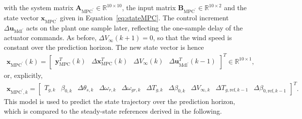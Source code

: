 with the system matrix $\bm{A}_{\text{MPC}^\prime} \in \mathbb{R}^{10 \times 10}$, the input matrix $\bm{B}_{\text{MPC}^\prime} \in \mathbb{R}^{10 \times 2}$ and the state vector $\bm{x}_{\text{MPC}^\prime}$ given in Equation~\eqref{eq:stateMPC}.
The control increment $\Delta\bm{u}_{\text{Mdl}^\prime}$ acts on the plant one sample later, reflecting the one-sample delay of the actuator commands. As before, $\Delta V_{\infty}(k+1) = 0$, so that the wind speed is constant over the prediction horizon. The new state vector is hence
\begin{align} \label{eq:stateMPC}
    \bm{x}_{\text{MPC}^\prime}(k) = \begin{bmatrix} \bm{y}_{\text{MPC}}^T(k) & \Delta\bm{x}_{\text{MPC}}^T(k) & \Delta V_{\infty}(k) & \Delta\bm{u}_{\text{Mdl}^\prime}^T(k-1) \end{bmatrix}^T \in \mathbb{R}^{10 \times 1},
\end{align}
or, explicitly,
\begin{align*}
    \bm{x}_{\text{MPC}^\prime,k} = \begin{bmatrix} T_{g,k} & \beta_{0,k} & \Delta \theta_{s,k} & \Delta \omega_{r,k} & \Delta \omega_{gr,k} & \Delta T_{g,k} & \Delta \beta_{0,k} & \Delta V_{\infty,k} & \Delta T_{g,\text{ref},k-1} & \Delta\beta_{0,\text{ref},k-1} \end{bmatrix}^T.
\end{align*}
This model is used to predict the state trajectory over the prediction horizon, which is compared to the steady-state references derived in the following.

